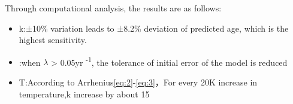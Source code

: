\documentclass{mcmthesis}
\begin{document}
\hspace{1.5em}Through computational analysis, the results are as follows:
\begin{itemize}
\item {k}:±10\% variation leads to ±8.2\% deviation of predicted age, which is the highest sensitivity.
\item {\lambda}:when  $\lambda$  > 0.05yr
\textsuperscript{-1}, the tolerance of initial error of the model is reduced
\item {T}:According to Arrhenius\ref{eq:2}-\ref{eq:3}，For every 20K increase in temperature,k
increase by about 15%
\end{itemize}


\end{document}
